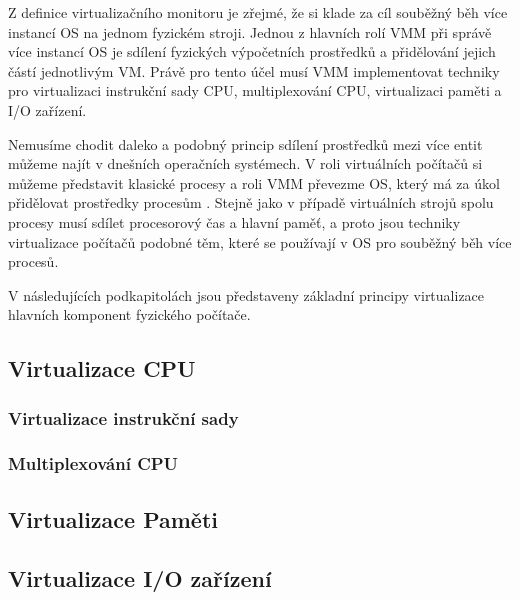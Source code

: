 Z definice virtualizačního monitoru je zřejmé, že si klade za cíl souběžný běh více instancí OS na jednom fyzickém stroji. Jednou z hlavních rolí VMM při správě více instancí OS je sdílení fyzických výpočetních prostředků a přidělování jejich částí 
jednotlivým VM. Právě pro tento účel musí VMM implementovat techniky pro virtualizaci instrukční sady CPU, multiplexování CPU, virtualizaci paměti a I/O zařízení.

Nemusíme chodit daleko a podobný princip sdílení prostředků mezi více entit můžeme najít v dnešních operačních systémech. V roli virtuálních počítačů si můžeme představit klasické procesy a roli VMM převezme OS, který má za úkol
přidělovat prostředky procesům \cite{virt1}. Stejně jako v případě virtuálních strojů spolu procesy musí sdílet procesorový čas a hlavní paměť, a proto jsou techniky virtualizace počítačů podobné těm, které se používají v OS pro 
souběžný běh více procesů.

V následujících podkapitolách jsou představeny základní principy virtualizace hlavních komponent fyzického počítače. 

\subsection{Virtualizace CPU}



\subsubsection*{Virtualizace instrukční sady}

\cite{virt3}

\subsubsection*{Multiplexování CPU}

\cite{vmm_book}

\subsection{Virtualizace Paměti}
\subsection{Virtualizace I/O zařízení}


